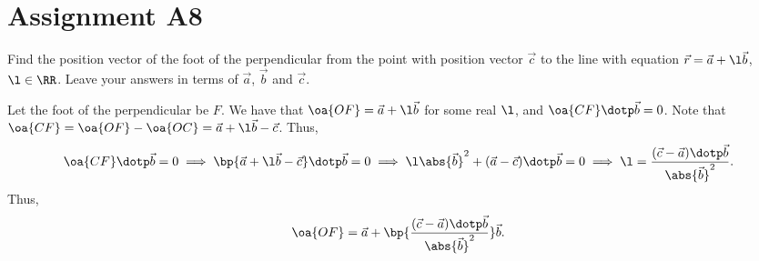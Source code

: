 \section{Assignment A8}

\begin{problem}
    Find the position vector of the foot of the perpendicular from the point with position vector $\vec c$ to the line with equation $\vec r = \vec a + \l \vec b$, $\l \in \RR$. Leave your answers in terms of $\vec a$, $\vec b$ and $\vec c$.
\end{problem}
\begin{solution}
    Let the foot of the perpendicular be $F$. We have that $\oa{OF} = \vec a + \l \vec b$ for some real $\l$, and $\oa{CF} \dotp \vec b = 0$. Note that $\oa{CF} = \oa{OF} - \oa{OC} = \vec a + \l \vec b - \vec c$. Thus, \[\oa{CF} \dotp \vec b = 0 \implies \bp{\vec a + \l \vec b - \vec c} \dotp \vec b = 0 \implies \l \abs{\vec b}^2 + (\vec a - \vec c) \dotp \vec b = 0 \implies \l = \frac{(\vec c - \vec a) \dotp \vec b}{\abs{\vec b}^2}.\] Thus, \[\oa{OF} = \vec a + \bp{\frac{(\vec c - \vec a) \dotp \vec b}{\abs{\vec b}^2}} \vec b.\]
\end{solution}

